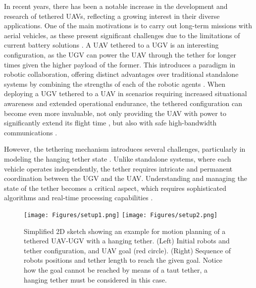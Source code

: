 In recent years, there has been a notable increase in the development and research of tethered UAVs, reflecting a growing interest in their diverse applications. One of the main motivations is to carry out long-term missions with aerial vehicles, as these present significant challenges due to the limitations of current battery solutions \cite{robotics12040117}. A UAV tethered to a UGV is an interesting configuration, as the UGV can power the UAV through the tether for longer times given the higher payload of the former.  %
This introduces a paradigm in robotic collaboration, offering distinct advantages over traditional standalone systems by combining the strengths of each of the robotic agents \cite{MooreIROS2018}. %
When deploying a UGV tethered to a UAV in scenarios requiring increased situational awareness and extended operational endurance, the tethered configuration can become even more invaluable, not only providing the UAV with power to significantly extend its flight time \cite{6961531},  %
but also with safe high-bandwidth communications \cite{850822,9202196}. 

However, the tethering mechanism introduces several challenges, particularly in modeling the hanging tether state \cite{XiaoSSRR2018}. Unlike standalone systems, where each vehicle operates independently, the tether requires intricate and permanent coordination between the UGV and the UAV. Understanding and managing the state of the tether becomes a critical aspect, which requires sophisticated algorithms and real-time processing capabilities \cite{9561062}. 

\begin{figure}
  \texttt{[image: Figures/setup1.png]}
  \hfill
  \texttt{[image: Figures/setup2.png]}
  \caption{Simplified 2D sketch showing an example for motion planning of a tethered UAV-UGV with a hanging tether. (Left) Initial robots and tether configuration, and UAV goal (red circle). (Right) Sequence of robots positions and tether length to reach the given goal. Notice how the goal cannot be reached by means of a taut tether, a hanging tether must be considered in this case.}
  \label{fig:planning-setup}
\end{figure}

